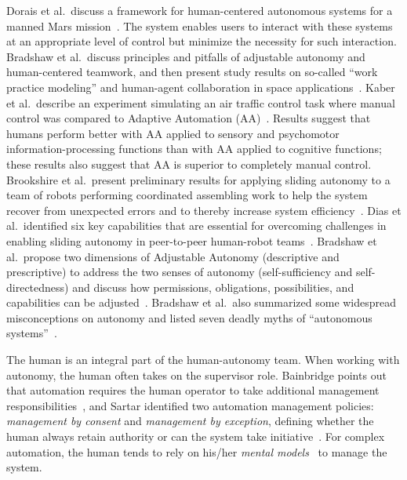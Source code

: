 Dorais et al.\ discuss a framework for human-centered autonomous systems for a manned Mars mission~\cite{Dorais1998AdjustableAutonomy}. The system enables users to interact with these systems at an appropriate level of control but minimize the necessity for such interaction. Bradshaw et al.\ discuss principles and pitfalls of adjustable autonomy and human-centered teamwork, and then present study results on so-called ``work practice modeling'' and human-agent collaboration in space applications~\cite{Bradshaw2003AdjustableAutonomy}. Kaber et al.\ describe an experiment simulating an air traffic control task where manual control was compared to Adaptive Automation (AA)~\cite{Kaber2005Adaptive}. Results suggest that humans perform better with AA applied to sensory and psychomotor information-processing functions than with AA applied to cognitive functions; these results also suggest that AA is superior to completely manual control. Brookshire et al.\ present preliminary results for applying sliding autonomy to a team of robots performing coordinated assembling work to help the system recover from unexpected errors and to thereby increase system efficiency~\cite{Brookshire2004Preliminary}. Dias et al.\ identified six key capabilities that are essential for overcoming challenges in enabling sliding autonomy in peer-to-peer human-robot teams~\cite{Dias2008SlidingAutonomy}. Bradshaw et al.\ propose two dimensions of Adjustable Autonomy (descriptive and prescriptive) to address the two senses of autonomy (self-sufficiency and self-directedness) and discuss how permissions, obligations, possibilities, and capabilities can be adjusted~\cite{Bradshaw2004Dimensions}. Bradshaw et al.\ also summarized some widespread misconceptions on autonomy and listed seven deadly myths of ``autonomous systems''~\cite{Bradshaw2013Seven}.

The human is an integral part of the human-autonomy team. When working with autonomy, the human often takes on the supervisor role. Bainbridge points out that automation requires the human operator to take additional management responsibilities~\cite{Bainbridge1983Ironies}, and Sartar identified two automation management policies: \textit{management by consent} and \textit{management by exception}, defining whether the human always retain authority or can the system take initiative~\cite{Sarter1998Making}. For complex automation, the human tends to rely on his/her \textit{mental models}~\cite{Norman1983Some} to manage the system. 

